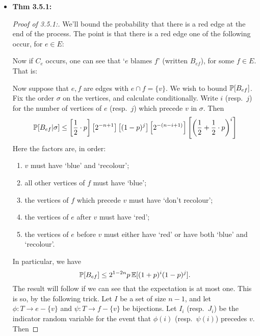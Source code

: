 \documentclass[11pt]{article}
\newenvironment{INT}[1][]{\begin{itemize}\small\item\textbf{#1}}{\end{itemize}}
\begin{document}
\begin{chapter3}
\begin{itemise}
\begin{INT}[Thm 3.5.1:]
\begin{proof}[Proof of 3.5.1:]
\INDENT We'll bound the probability that there is a red edge at the end of the process. The point is that there is a red edge \Iff one of the following occur, for $e\in E$:
Now if $C_e$ occurs, one can see that `$e$ blames $f$' (written $B_{ef}$), for some $f\in E$. That is:
Now suppose that $e,f$ are edges with $e\cap f=\{v\}$. We wish to bound $\operatorname{\mathbb{P}}[B_{ef}]$. Fix the order $\sigma$ on the vertices, and calculate conditionally. Write $i$ (resp.\ $j$) for the number of vertices of $e$ (resp.\ $j$) which precede $v$ in $\sigma$. Then
\[\operatorname{\mathbb{P}}[B_{ef}|\sigma]\leq\left[\frac{1}{2}\cdot p\right] \left[2^{-n+1}\right] \left[(1-p)^j\right] \left[2^{-(n-i+1)}\right] \left[\left(\frac{1}{2}+\frac{1}{2}\cdot p\right)^i\right]\]
Here the factors are, in order:
\begin{enumerate}\squishlist
\item $v$ must have `blue' and `recolour';
\item all other vertices of $f$ must have `blue';
\item the vertices of $f$ which precede $v$ must have `don't recolour';
\item the vertices of $e$ after $v$ must have `red';
\item the vertices of $e$ before $v$ must either have `red' or have both `blue' and `recolour'.
\end{enumerate}
In particular, we have
\[\operatorname{\mathbb{P}}[B_{ef}]\leq 2^{1-2n}p\operatorname{\mathbb{E}}[(1+p)^i(1-p)^j].\]
The result will follow if we can see that the expectation is at most one. This is so, by the following trick. Let $I$ be a set of size $n-1$, and let $\phi:T\to e-\{v\}$ and $\psi:T\to f-\{v\}$ be bijections. Let $I_i$ (resp.\ $J_i$) be the indicator random variable for the event that $\phi(i)$ (resp.\ $\psi(i)$) precedes $v$. Then

\end{proof}
\end{INT}
\end{itemise}
\end{chapter3}
\end{document}
